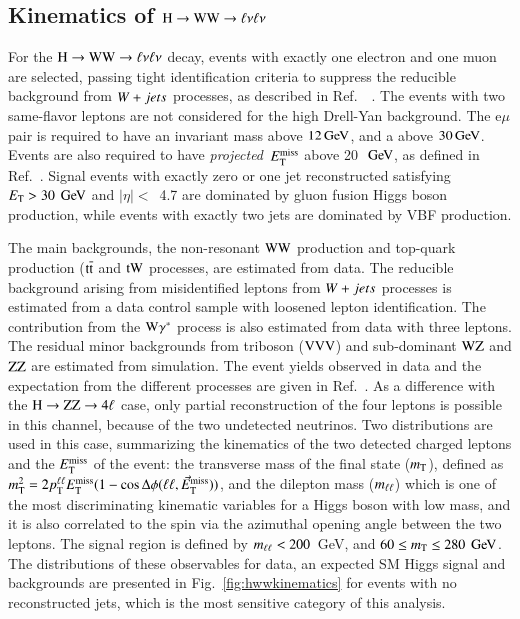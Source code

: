 \subsection{Kinematics of $\mathrm{H}\to\mathrm{W}\mathrm{W}\to\ell\nu\ell\nu$}
\label{sec:hwwkinematics}

For the $\mathrm{H}\to\mathrm{W}\mathrm{W}\to\ell\nu\ell\nu$ decay, events with exactly one electron and one
muon are selected, passing tight identification criteria to suppress
the reducible background from $W+jets$ processes, as described in
Ref.~~\cite{Chatrchyan:2013iaa}.  The events with two same-flavor
leptons are not considered for the high Drell-Yan background.  The
$\mathrm{e}\mu$ pair is required to have an invariant mass above
$12\,\mathrm{Ge\hspace{-.08em}V}$, and a \pt above $30\,\mathrm{Ge\hspace{-.08em}V}$. Events are also required to have
\textit{projected}~$E_{\mathrm{T}}^{\mathrm{miss}}$ above 20~$\,\mathrm{Ge\hspace{-.08em}V}$, as defined in
Ref.~\cite{Chatrchyan:2013iaa}. Signal events with exactly zero or one
jet reconstructed satisfying $E_{\mathrm{T}}>30~\,\mathrm{Ge\hspace{-.08em}V}$ and $|\eta|<$~4.7 are
dominated by gluon fusion Higgs boson production, while events with
exactly two jets are dominated by VBF production.

The main backgrounds, the non-resonant $\mathrm{W}\mathrm{W}$ production and
top-quark production ($\mathrm{t}\overline{\mathrm{t}}$ and $\mathrm{t}\mathrm{W}$ processes, are estimated from
data.  The reducible background arising from misidentified leptons
from $W+jets$ processes is estimated from a data control sample with
loosened lepton identification. The contribution from the $\mathrm{W}\gamma^*$
process is also estimated from data with three leptons. The residual
minor backgrounds from triboson ($\mathrm{V}\mathrm{V}\mathrm{V}$) and sub-dominant $\mathrm{W}\mathrm{Z}$
and $\mathrm{Z}\mathrm{Z}$ are estimated from simulation.
%
The event yields observed in data and the expectation from 
the different processes are given in Ref.~\cite{Chatrchyan:2013iaa}.
%
As a difference with the $\mathrm{H}\to\mathrm{Z}\mathrm{Z}\to4\ell$ case, only partial reconstruction
of the four leptons is possible in this channel, because of the two
undetected neutrinos. Two distributions are used in this case,
summarizing the kinematics of the two detected charged leptons and the
$E_{\mathrm{T}}^{\mathrm{miss}}$ of the event: the transverse mass of the final state ($m_{\mathrm{T}}$),
defined as $m_{\mathrm{T}}^2 = 2 p_{\mathrm{T}}^{\ell\ell} E_{\mathrm{T}}^{\mathrm{miss}} (1-\cos\Delta\phi(\ell\ell,\vec{E}_\mathrm{T}^{\mathrm{miss}}))$, and the
dilepton mass ($m_{\ell\ell}$) which is one of the most discriminating
kinematic variables for a Higgs boson with low mass, and it is also
correlated to the spin via the azimuthal opening angle between the
two leptons. 
%
The signal region is defined by $m_{\ell\ell} < 200$~GeV, and $60 \leq m_{\mathrm{T}}
\leq 280~\,\mathrm{Ge\hspace{-.08em}V}$.  The distributions of these observables for data, an
expected SM Higgs signal and backgrounds are presented in
Fig.~\ref{fig:hwwkinematics} for events with no reconstructed jets,
which is the most sensitive category of this analysis.
%

